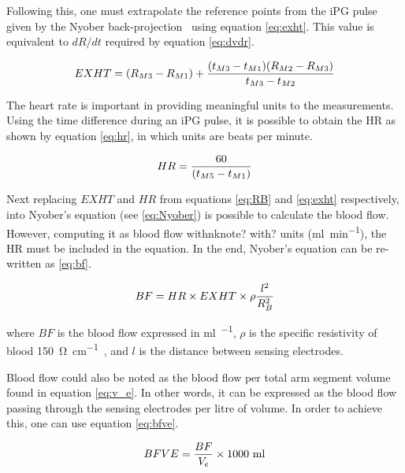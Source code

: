 Following this, one must extrapolate the reference points from the iPG pulse given by the Nyober back-projection~\cite{montgomery2011segmental} using equation \ref{eq:exht}. This value is equivalent to $dR/dt$ required  by equation \ref{eq:dvdr}.

\begin{align}
	\label{eq:exht}
	EXHT = (R_{M3}-R_{M1}) + \frac{(t_{M3}-t_{M1})(R_{M2}-R_{M3})}{t_{M3}-t_{M2}} \tagaddtext{[\si{\Omega}]}
\end{align}

The heart rate is important in providing meaningful units to the measurements. Using the time difference during an iPG pulse, it is possible to obtain the HR as shown by equation \ref{eq:hr}, in which units are beats per minute.

\begin{align}
	\label{eq:hr}
	HR = \frac{60}{(t_{M5}-t_{M1})}  \tagaddtext{[\si{bpm}]}
\end{align}

Next replacing  $EXHT$ and $HR$ from equations \ref{eq:RB} and \ref{eq:exht} respectively, into Nyober's equation (see \ref{eq:Nyober}) is possible to calculate the blood flow. However, computing it as blood flow withnknote{? with?} units (\si{\milli\litre\per\minute}), the HR must be included in the equation. In the end, Nyober's equation can be re-written as \ref{eq:bf}. 

\begin{align}
	\label{eq:bf}
	BF = HR \times EXHT \times \rho \frac{l^2}{R_B^2} \tagaddtext{[\si{\ml\per\min}]}
\end{align}

where $BF$ is the blood flow expressed in \si{\milli\litre\per\min}, $\rho$ is the specific resistivity of blood \SI{150}{\ohm\per\cm}~\cite{mohapatra1981non, nyober1950electrical}, and $l$ is the distance between sensing electrodes.

Blood flow could also be noted as the blood flow per total arm segment volume found in equation \ref{eq:v_e}.  In other words, it can be expressed as the blood flow passing through the sensing electrodes per litre of volume. In order to achieve this, one can use equation \ref{eq:bfve}.

\begin{align}
	\label{eq:bfve}
	BFVE = \frac{BF}{V_e} \times \text{1000 ml} \tagaddtext{[\si{\ml\per\min.\litre}]}
\end{align}

